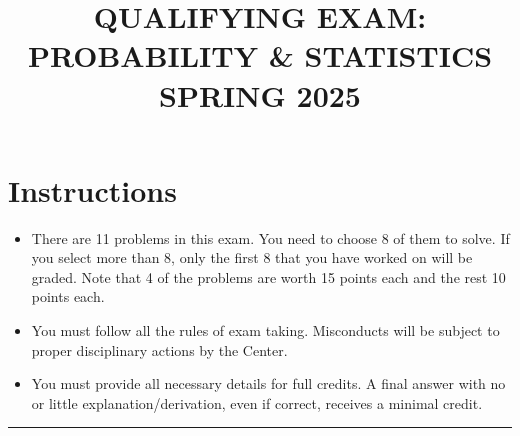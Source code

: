 \documentclass[11pt,a4paper]{article}
\title{\textbf{QUALIFYING EXAM: PROBABILITY \& STATISTICS}\\[0.5em]\Large SPRING 2025}
\date{}
\author{}
\begin{document}
\maketitle
\vspace{-3em}

\section*{Instructions}
\begin{itemize}
    \item There are 11 problems in this exam. You need to choose 8 of them to solve. If you select more than 8, only the first 8 that you have worked on will be graded. Note that 4 of the problems are worth 15 points each and the rest 10 points each.
    \item You must follow all the rules of exam taking. Misconducts will be subject to proper disciplinary actions by the Center.
    \item You must provide all necessary details for full credits. A final answer with no or little explanation/derivation, even if correct, receives a minimal credit.
\end{itemize}

\noindent\rule{\linewidth}{0.4pt}
\end{document}
